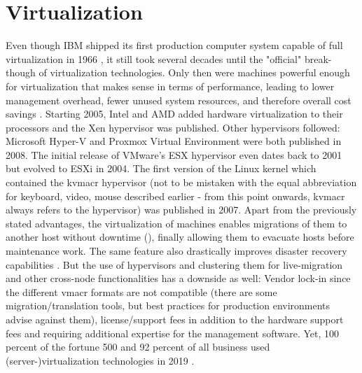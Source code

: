 \section{Virtualization}
Even though IBM shipped its first production computer system capable of full virtualization in 1966 \cite{ibm_first_hypervisor}, it still took several decades until the "official" break-though of virtualization technologies. Only then were machines powerful enough for virtualization that makes sense in terms of performance, leading to lower management overhead, fewer unused system resources, and therefore overall cost savings \cite{xen_killer}.
Starting 2005, Intel and AMD added hardware virtualization to their processors and the Xen hypervisor was published. Other hypervisors followed: Microsoft Hyper-V and Proxmox Virtual Environment were both published in 2008. The initial release of VMware's ESX hypervisor even dates back to 2001 but evolved to ESXi in 2004. The first version of the Linux kernel which contained the \gls{kvmacr} hypervisor (not to be mistaken with the equal abbreviation for keyboard, video, mouse described earlier - from this point onwards, \gls{kvmacr} always refers to the hypervisor) was published in 2007.
\newline
Apart from the previously stated advantages, the virtualization of machines enables migrations of them to another host without downtime (), finally allowing them to evacuate hosts before maintenance work. The same feature also drastically improves disaster recovery capabilities \cite{definition_server_virtualization}.
\newline
But the use of hypervisors and clustering them for live-migration and other cross-node functionalities has a downside as well: Vendor lock-in since the different \gls{vmacr} formats are not compatible (there are some migration/translation tools, but best practices for production environments advise against them), license/support fees in addition to the hardware support fees and requiring additional expertise for the management software.
\newline
Yet, 100 percent of the fortune 500 and 92 percent of all business used (server-)virtualization technologies in 2019 \cite{adoption_of_virtualization_technologies} \cite{vmware_accelerate_it} \cite{spiceworks_state_of_virtualization}.



